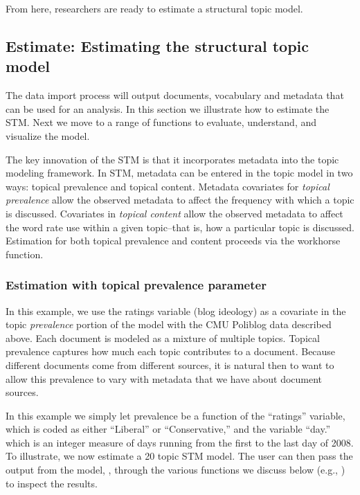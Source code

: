 \documentclass[article,shortnames]{jss}
\begin{document}
From here, researchers are ready to estimate a structural topic model.

\subsection{Estimate: Estimating the structural topic model}

The data import process will output documents, vocabulary and metadata that can be used for an analysis. In this section we illustrate how to estimate the STM. Next we move to a range of functions to evaluate, understand, and visualize the model.


The key innovation of the STM is that it incorporates metadata into the topic modeling framework.  In STM, metadata can be entered in the topic model in two ways: topical prevalence and topical content.  Metadata covariates for \emph{topical prevalence} allow the observed metadata to affect the frequency with which a topic is discussed.  Covariates in \emph{topical content} allow the observed metadata to affect the word rate use within a given topic--that is, how a particular topic is discussed. Estimation for both topical prevalence and content proceeds via the workhorse  function.

\subsubsection{Estimation with topical prevalence parameter}

In this example, we use the ratings variable (blog ideology) as a covariate in the topic \emph{prevalence} portion of the model with the CMU Poliblog data described above. Each document is modeled as a mixture of multiple topics. Topical prevalence captures how much each topic contributes to a document. Because different documents come from different sources, it is natural then to want to allow this prevalence to vary with metadata that we have about document sources.

In this example we simply let prevalence be a function of the ``ratings'' variable, which is coded as either ``Liberal'' or ``Conservative,'' and the variable ``day.'' which is an integer measure of days running from the first to the last day of 2008. To illustrate, we now estimate a 20 topic STM model. The user can then pass the output from the model, , through the various functions we discuss below (e.g., ) to inspect the results.
\end{document}
